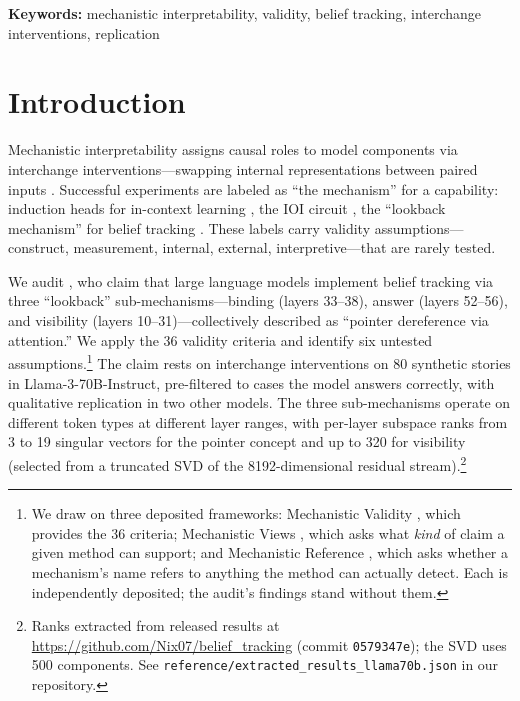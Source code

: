 \documentclass{article}
\begin{document}
\noindent\textbf{Keywords:} mechanistic interpretability, validity, belief tracking, interchange interventions, replication


\section{Introduction}
\label{sec:intro}

Mechanistic interpretability assigns causal roles to model components via interchange interventions---swapping internal representations between paired inputs \citep{geiger2021causal, vig2020investigating}. Successful experiments are labeled as ``the mechanism'' for a capability: induction heads for in-context learning \citep{olsson2022context}, the IOI circuit \citep{wang2023interpretability}, the ``lookback mechanism'' for belief tracking \citep{prakash2025lookback}. These labels carry validity assumptions---construct, measurement, internal, external, interpretive---that are rarely tested.

We audit \citet{prakash2025lookback}, who claim that large language models implement belief tracking via three ``lookback'' sub-mechanisms---binding (layers 33--38), answer (layers 52--56), and visibility (layers 10--31)---collectively described as ``pointer dereference via attention.'' We apply the 36 validity criteria and identify six untested assumptions.\footnote{We draw on three deposited frameworks: Mechanistic Validity \citep{tower2026mechval}, which provides the 36 criteria; Mechanistic Views \citep{tower2026mechviews}, which asks what \emph{kind} of claim a given method can support; and Mechanistic Reference \citep{tower2026mechref}, which asks whether a mechanism's name refers to anything the method can actually detect. Each is independently deposited; the audit's findings stand without them.} The claim rests on interchange interventions on 80 synthetic stories in Llama-3-70B-Instruct, pre-filtered to cases the model answers correctly, with qualitative replication in two other models. The three sub-mechanisms operate on different token types at different layer ranges, with per-layer subspace ranks from 3 to 19 singular vectors for the pointer concept and up to 320 for visibility (selected from a truncated SVD of the 8192-dimensional residual stream).\footnote{Ranks extracted from released results at \url{https://github.com/Nix07/belief_tracking} (commit \texttt{0579347e}); the SVD uses 500 components. See \texttt{reference/extracted\_results\_llama70b.json} in our repository.}
\end{document}
